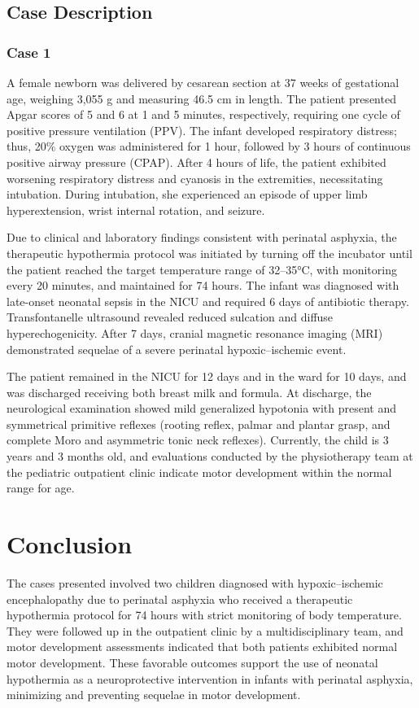 \documentclass[11pt,a4paper]{article}
\begin{document}
	\subsection{Case Description}
	\subsubsection{Case 1}
	A female newborn was delivered by cesarean section at 37 weeks of gestational age, weighing 3,055 g and measuring 46.5 cm in length. The patient presented Apgar scores of 5 and 6 at 1 and 5 minutes, respectively, requiring one cycle of positive pressure ventilation (PPV). The infant developed respiratory distress; thus, 20\% oxygen was administered for 1 hour, followed by 3 hours of continuous positive airway pressure (CPAP). After 4 hours of life, the patient exhibited worsening respiratory distress and cyanosis in the extremities, necessitating intubation. During intubation, she experienced an episode of upper limb hyperextension, wrist internal rotation, and seizure.
	
	Due to clinical and laboratory findings consistent with perinatal asphyxia, the therapeutic hypothermia protocol was initiated by turning off the incubator until the patient reached the target temperature range of 32–35°C, with monitoring every 20 minutes, and maintained for 74 hours. The infant was diagnosed with late-onset neonatal sepsis in the NICU and required 6 days of antibiotic therapy. Transfontanelle ultrasound revealed reduced sulcation and diffuse hyperechogenicity. After 7 days, cranial magnetic resonance imaging (MRI) demonstrated sequelae of a severe perinatal hypoxic–ischemic event.
	
	The patient remained in the NICU for 12 days and in the ward for 10 days, and was discharged receiving both breast milk and formula. At discharge, the neurological examination showed mild generalized hypotonia with present and symmetrical primitive reflexes (rooting reflex, palmar and plantar grasp, and complete Moro and asymmetric tonic neck reflexes). Currently, the child is 3 years and 3 months old, and evaluations conducted by the physiotherapy team at the pediatric outpatient clinic indicate motor development within the normal range for age.
		
	\section{Conclusion}
	The cases presented involved two children diagnosed with hypoxic–ischemic encephalopathy due to perinatal asphyxia who received a therapeutic hypothermia protocol for 74 hours with strict monitoring of body temperature. They were followed up in the outpatient clinic by a multidisciplinary team, and motor development assessments indicated that both patients exhibited normal motor development. These favorable outcomes support the use of neonatal hypothermia as a neuroprotective intervention in infants with perinatal asphyxia, minimizing and preventing sequelae in motor development.
	
	\newpage
	
	\printbibliography[title=References]
		
\end{document}
